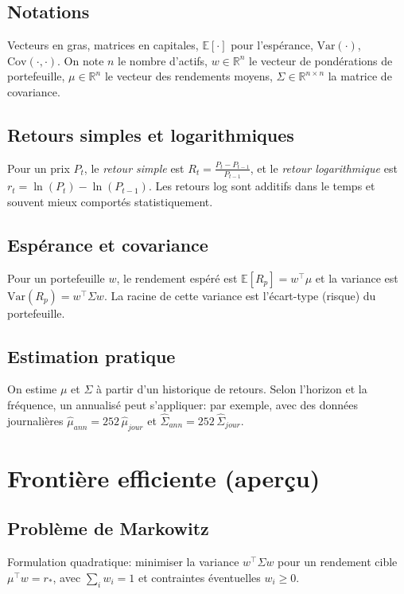 \documentclass[11pt,a4paper]{article}
\begin{document}
\subsection{Notations}
Vecteurs en gras, matrices en capitales, $\mathbb{E}[\cdot]$ pour l'espérance, $\mathrm{Var}(\cdot)$, $\mathrm{Cov}(\cdot,\cdot)$. On note $n$ le nombre d'actifs, $w \in \mathbb{R}^n$ le vecteur de pondérations de portefeuille, $\mu \in \mathbb{R}^n$ le vecteur des rendements moyens, $\Sigma \in \mathbb{R}^{n\times n}$ la matrice de covariance.

\subsection{Retours simples et logarithmiques}
Pour un prix $P_t$, le \emph{retour simple} est $R_t = \frac{P_t - P_{t-1}}{P_{t-1}}$, et le \emph{retour logarithmique} est $r_t = \ln(P_t) - \ln(P_{t-1})$. Les retours log sont additifs dans le temps et souvent mieux comportés statistiquement.

\subsection{Espérance et covariance}
Pour un portefeuille $w$, le rendement espéré est $\mathbb{E}[R_p] = w^\top \mu$ et la variance est $\mathrm{Var}(R_p) = w^\top \Sigma w$. La racine de cette variance est l'écart-type (risque) du portefeuille.

\subsection{Estimation pratique}
On estime $\mu$ et $\Sigma$ à partir d'un historique de retours. Selon l'horizon et la fréquence, un annualis\'e peut s'appliquer: par exemple, avec des données journali\`eres $\hat{\mu}_{ann} = 252\,\hat{\mu}_{jour}$ et $\hat{\Sigma}_{ann} = 252\,\hat{\Sigma}_{jour}$.

\section{Frontière efficiente (aperçu)}
\subsection{Problème de Markowitz}
Formulation quadratique: minimiser la variance $w^\top \Sigma w$ pour un rendement cible $\mu^\top w = r_*$, avec $\sum_i w_i = 1$ et contraintes éventuelles $w_i \ge 0$.
\end{document}
